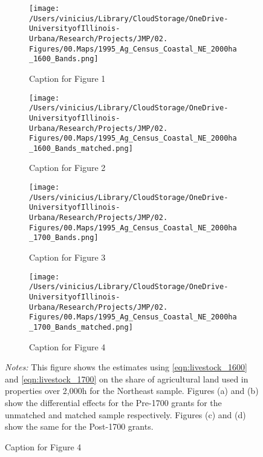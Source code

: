\documentclass[11pt]{article}
\begin{document}
\clearpage

\begin{landscape}
  \begin{figure}[htbp]
    \centering
    \caption{Effects of Coastal Ban with Varying Cutoffs on Agricultural Land on Properties over 2,000ha - Northeast samples}
    \begin{subfigure}[b]{0.65\textwidth}
        \centering
        \texttt{[image: /Users/vinicius/Library/CloudStorage/OneDrive-UniversityofIllinois-Urbana/Research/Projects/JMP/02. Figures/00.Maps/1995\_Ag\_Census\_Coastal\_NE\_2000ha\_1600\_Bands.png]}
        \caption{Caption for Figure 1}
        \label{fig:fig1}
    \end{subfigure}
    \hfill
    \begin{subfigure}[b]{0.65\textwidth}
        \centering
        \texttt{[image: /Users/vinicius/Library/CloudStorage/OneDrive-UniversityofIllinois-Urbana/Research/Projects/JMP/02. Figures/00.Maps/1995\_Ag\_Census\_Coastal\_NE\_2000ha\_1600\_Bands\_matched.png]}
        \caption{Caption for Figure 2}
        \label{fig:fig2}
    \end{subfigure}

    \vspace{0.1cm} %

    \begin{subfigure}[b]{0.65\textwidth}
        \centering
        \texttt{[image: /Users/vinicius/Library/CloudStorage/OneDrive-UniversityofIllinois-Urbana/Research/Projects/JMP/02. Figures/00.Maps/1995\_Ag\_Census\_Coastal\_NE\_2000ha\_1700\_Bands.png]}
        \caption{Caption for Figure 3}
        \label{fig:fig3}
    \end{subfigure}
    \hfill
    \begin{subfigure}[b]{0.65\textwidth}
        \centering
        \texttt{[image: /Users/vinicius/Library/CloudStorage/OneDrive-UniversityofIllinois-Urbana/Research/Projects/JMP/02. Figures/00.Maps/1995\_Ag\_Census\_Coastal\_NE\_2000ha\_1700\_Bands\_matched.png]}
        \caption{Caption for Figure 4}
        \label{fig:fig4}
    \end{subfigure}

    \vspace{0.5cm}
    \justifying
    \noindent \textit{Notes:} This figure shows the estimates using \autoref{eqn:livestock_1600} and \autoref{eqn:livestock_1700} on the share of agricultural land used in properties over 2,000h for the Northeast sample. Figures (a) and (b) show the differential effects for the Pre-1700 grants for the unmatched and matched sample respectively. Figures (c) and (d) show the same for the Post-1700 grants.
    \label{fig:robustness_NE_landsize_distance_cutoff}
    
\end{figure}
\end{landscape}
\end{document}
